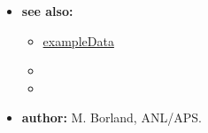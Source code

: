 \begin{itemize}
\begin{itemize}
\begin{table}[hbt]
        \label{table3}
        \end{table}
     \end{itemize}
\item {\bf see also:}
    \begin{itemize}
    \item \hyperref{Data for Examples}{Data for Examples (see }{)}{exampleData}
    \item {}
    \item {}
    \end{itemize}
\item {\bf author:} M. Borland, ANL/APS.
\end{itemize}

